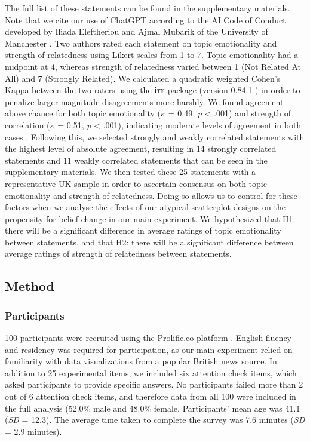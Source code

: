 \documentclass[manuscript,screen,review,anonymous]{acmart}
\begin{document}
The full list of these statements can be found in the supplementary
materials. Note that we cite our use of ChatGPT according to the AI Code
of Conduct developed by Iliada Eleftheriou and Ajmal Mubarik of the
University of Manchester \citep{iliada_2023}. Two authors rated each
statement on topic emotionality and strength of relatedness using Likert
scales from 1 to 7. Topic emotionality had a midpoint at 4, whereas
strength of relatedness varied between 1 (Not Related At All) and 7
(Strongly Related). We calculated a quadratic weighted Cohen's Kappa
between the two raters using the \textbf{irr} package (version 0.84.1
\citep{irr}) in order to penalize larger magnitude disagreements more
harshly. We found agreement above chance for both topic emotionality
(\(\kappa\) = 0.49, \emph{p} \textless{} .001) and strength of
correlation (\(\kappa\) = 0.51, \emph{p} \textless{} .001), indicating
moderate levels of agreement in both cases
\citep{cohen_1968, fleiss_1969}. Following this, we selected strongly
and weakly correlated statements with the highest level of absolute
agreement, resulting in 14 strongly correlated statements and 11 weakly
correlated statements that can be seen in the supplementary materials.
We then tested these 25 statements with a representative UK sample in
order to ascertain consensus on both topic emotionality and strength of
relatedness. Doing so allows us to control for these factors when we
analyse the effects of our atypical scatterplot designs on the
propensity for belief change in our main experiment. We hypothesized
that H1: there will be a significant difference in average ratings of
topic emotionality between statements, and that H2: there will be a
significant difference between average ratings of strength of
relatedness between statements.

\subsection{Method}\label{sec-method-pre}

\subsubsection{Participants}\label{sec-participants-pre}

100 participants were recruited using the Prolific.co platform
\citep{prolific}. English fluency and residency was required for
participation, as our main experiment relied on familiarity with data
visualizations from a popular British news source. In addition to 25
experimental items, we included six attention check items, which asked
participants to provide specific answers. No participants failed more
than 2 out of 6 attention check items, and therefore data from all 100
were included in the full analysis (52.0\% male and 48.0\% female.
Participants' mean age was 41.1 (\emph{SD} = 12.3). The average time
taken to complete the survey was 7.6 minutes (\emph{SD} = 2.9 minutes).
\end{document}
